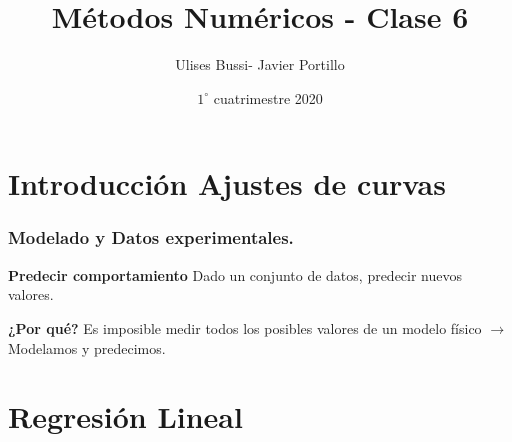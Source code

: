 \documentclass[xcolor=svgnames]{beamer} %
\title{Métodos Numéricos - Clase 6}
\author{Ulises Bussi- Javier Portillo}
\date{ $1^\circ$ cuatrimestre 2020}
\theoremstyle{plain}
\renewcommand{\textbf}[1]{{\bfseries\textcolor{redUnq2}{#1}}}
\theoremstyle{definition}
\begin{document}
 


\begin{frame} %
	\titlepage
\end{frame}

\begin{frame}
\tableofcontents
\end{frame}


\section{Introducción Ajustes de curvas}

\begin{frame}
\frametitle{Modelado y Datos experimentales.}

\vspace{10pt}


\begin{tcolorbox}
\textbf{Predecir comportamiento}
Dado un conjunto de datos, predecir nuevos valores.
\end{tcolorbox} \vspace{20pt}

\textbf{¿Por qué?}
\pause
Es imposible medir todos los posibles valores de un modelo físico \pause $\rightarrow$ Modelamos y predecimos.


\end{frame}

\section{Regresión Lineal}
\end{document}
